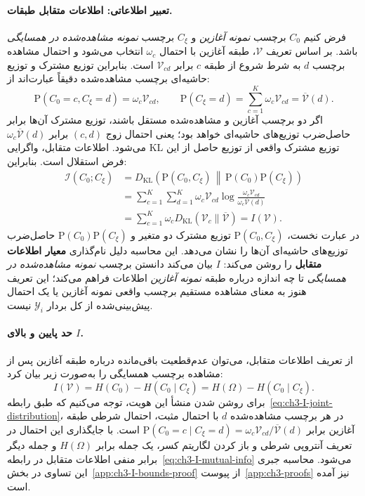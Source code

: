 \paragraph{تعبیر اطلاعاتی: اطلاعات متقابل طبقات.}
فرض کنیم $C_0$ برچسب \emph{نمونه آغازین} و $C_\xi$ برچسب \emph{نمونه مشاهده‌شده در همسایگی} باشد. بر اساس تعریف $\mathcal V$، طبقه آغازین با احتمال $\omega_c$ انتخاب می‌شود و احتمال مشاهده برچسب $d$ به شرط شروع از طبقه $c$ برابر $\mathcal V_{cd}$ است. بنابراین توزیع مشترک و توزیع حاشیه‌ای برچسب مشاهده‌شده دقیقاً عبارت‌اند از:
\begin{equation}\label{eq:ch3-I-joint-distribution}
\mathrm P(C_0=c,C_\xi=d)=\omega_c\mathcal V_{cd},
\qquad
\mathrm P(C_\xi=d)=\sum_{c=1}^{K}\omega_c\mathcal V_{cd}
=\overline{\mathcal V}(d).
\end{equation}
اگر دو برچسب آغازین و مشاهده‌شده مستقل باشند، توزیع مشترک آن‌ها برابر حاصل‌ضرب توزیع‌های حاشیه‌ای خواهد بود؛ یعنی احتمال زوج $(c,d)$ برابر $\omega_c\overline{\mathcal V}(d)$ می‌شود. اطلاعات متقابل، واگرایی KL توزیع مشترک واقعی از توزیع حاصل از این فرض استقلال است. بنابراین:
\begin{equation}\label{eq:ch3-I-mutual-info}
\begin{aligned}
\mathcal I(C_0;C_\xi)
&=D_{\mathrm{KL}}\!\left(
\mathrm P(C_0,C_\xi)
\,\middle\|\,
\mathrm P(C_0)\mathrm P(C_\xi)\right)\\
&=\sum_{c=1}^{K}\sum_{d=1}^{K}
\omega_c\mathcal V_{cd}
\log\frac{\omega_c\mathcal V_{cd}}
{\omega_c\overline{\mathcal V}(d)}\\
&=\sum_{c=1}^{K}\omega_c
D_{\mathrm{KL}}(\mathcal V_c\|\overline{\mathcal V})
=\boxed{I(\mathcal V)}.
\end{aligned}
\end{equation}
در عبارت نخست، $\mathrm P(C_0,C_\xi)$ توزیع مشترک دو متغیر و $\mathrm P(C_0)\mathrm P(C_\xi)$ حاصل‌ضرب توزیع‌های حاشیه‌ای آن‌ها را نشان می‌دهد.
این محاسبه دلیل نام‌گذاری \textbf{معیار اطلاعات متقابل} را روشن می‌کند: $I$ بیان می‌کند دانستن برچسب \emph{نمونه مشاهده‌شده در همسایگی} تا چه اندازه درباره طبقه \emph{نمونه آغازین} اطلاعات فراهم می‌کند؛ این تعریف هنوز به معنای مشاهده مستقیم برچسب واقعی نمونه آغازین یا یک احتمال پیش‌بینی‌شده از کل بردار $\mathscr Y_i$ نیست.

\paragraph{حد پایین و بالای $I$.}
از تعریف اطلاعات متقابل، می‌توان عدم‌قطعیت باقی‌مانده درباره طبقه آغازین پس از مشاهده برچسب همسایگی را به‌صورت زیر بیان کرد:
\begin{equation}\label{eq:ch3-I-conditional}
\boxed{I(\mathcal V)=H(C_0)-H(C_0\mid C_\xi)
=H(\Omega)-H(C_0\mid C_\xi).}
\end{equation}
برای روشن شدن منشأ این هویت، توجه می‌کنیم که طبق رابطه~\eqref{eq:ch3-I-joint-distribution}، در هر برچسب مشاهده‌شده $d$ با احتمال مثبت، احتمال شرطی طبقه آغازین برابر
$\mathrm P(C_0=c\mid C_\xi=d)=\omega_c\mathcal V_{cd}/\overline{\mathcal V}(d)$ است. با جایگذاری این احتمال در تعریف آنتروپی شرطی و باز کردن لگاریتم کسر، یک جمله برابر $H(\Omega)$ و جمله دیگر برابر منفی اطلاعات متقابل در رابطه~\eqref{eq:ch3-I-mutual-info} می‌شود. محاسبه جبری این تساوی در بخش~\ref{app:ch3-I-bounds-proof} از پیوست~\ref{app:ch3-proofs} نیز آمده است.

